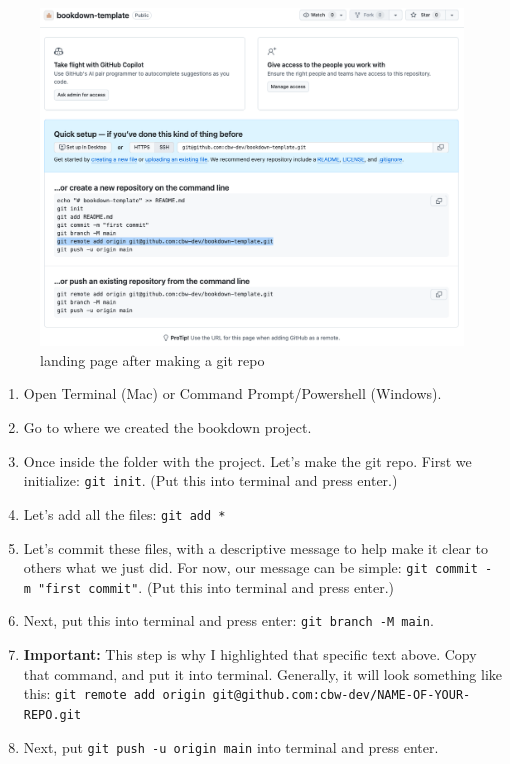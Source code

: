 \documentclass[
]{book}
\theoremstyle{definition}
\theoremstyle{definition}
\theoremstyle{definition}
\theoremstyle{definition}
\theoremstyle{remark}
\begin{document}
\begin{figure}
\centering
\includegraphics{img/git-instruct/git-connection.png}
\caption{landing page after making a git repo}
\end{figure}

\begin{enumerate}
\def\labelenumi{\arabic{enumi}.}
\setcounter{enumi}{4}
\item
  Open Terminal (Mac) or Command Prompt/Powershell (Windows).
\item
  Go to where we created the bookdown project.
\item
  Once inside the folder with the project. Let's make the git repo. First we initialize: \texttt{git\ init}. (Put this into terminal and press enter.)
\item
  Let's add all the files: \texttt{git\ add\ *}
\item
  Let's commit these files, with a descriptive message to help make it clear to others what we just did. For now, our message can be simple: \texttt{git\ commit\ -m\ "first\ commit"}. (Put this into terminal and press enter.)
\item
  Next, put this into terminal and press enter: \texttt{git\ branch\ -M\ main}.
\item
  \textbf{Important:} This step is why I highlighted that specific text above. Copy that command, and put it into terminal. Generally, it will look something like this: \texttt{git\ remote\ add\ origin\ git@github.com:cbw-dev/NAME-OF-YOUR-REPO.git}
\item
  Next, put \texttt{git\ push\ -u\ origin\ main} into terminal and press enter.
\end{enumerate}
\end{document}
